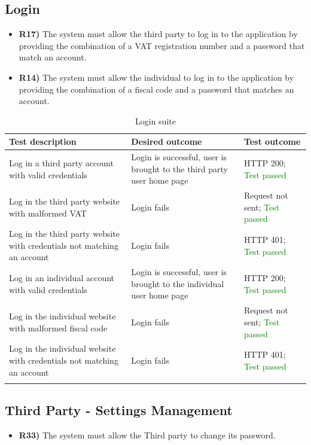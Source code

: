 \documentclass[titlepage]{article}
\begin{document}
\subsection{Login}
\begin{itemize}
    \item {\bf R17)} The system must allow the third party to log in to the application by providing the combination of a VAT registration number and a password that match an account.
    \item {\bf R14)} The system must allow the individual to log in to the application by providing the combination of a fiscal code and a password that matches an account.
\end{itemize}

\renewcommand*{\arraystretch}{1.4}
\begin{longtable}{| p{3 cm} | p{4 cm} | p{4 cm} |} \hline
    {\bf Test description} & {\bf Desired outcome} & {\bf Test outcome} \\ \hline
    Log in a third party account with valid credentials & 
    Login is successful, user is brought to the third party user home page
        & HTTP 200; \textcolor{green}{Test passed} \\ \hline
    Log in the third party website with malformed VAT & 
    Login fails 
        & Request not sent; \textcolor{green}{Test passed} \\ \hline
    Log in the third party website with credentials not matching an account & 
    Login fails 
        & HTTP 401; \textcolor{green}{Test passed} \\ \hline
    Log in an individual account with valid credentials & 
    Login is successful, user is brought to the individual user home page
        & HTTP 200; \textcolor{green}{Test passed} \\ \hline
    Log in the individual website with malformed fiscal code & 
    Login fails 
        & Request not sent; \textcolor{green}{Test passed} \\ \hline
    Log in the individual website with credentials not matching an account & 
    Login fails 
        & HTTP 401; \textcolor{green}{Test passed} \\ \hline
    \caption{Login suite}
\end{longtable}

\subsection{Third Party - Settings Management}
\begin{itemize}
    \item {\bf R33)} The system must allow the Third party to change its password.
\end{itemize}
\end{document}
